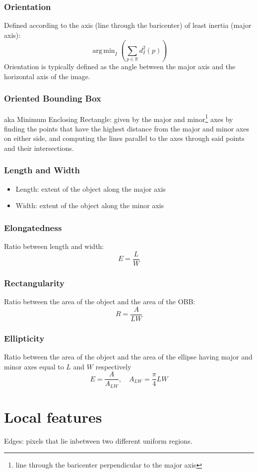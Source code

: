 \documentclass{article}
\DeclareMathOperator*{\argmin}{arg\,min}
\begin{document}
\subsubsection{Orientation}
Defined according to the axis (line through the baricenter) of least inertia (major axis):
\[
    \argmin_I\left( \displaystyle\sum_{p\in\mathbb{R}}^{}d_I^2(p)\right)
\]
Orientation is typically defined as the angle between the major axis and the horizontal axis of the image.
\subsubsection{Oriented Bounding Box}
aka Minimum Enclosing Rectangle: given by the major and minor\footnote{line through the baricenter perpendicular to the major axis} axes by finding the points that have the highest distance from the major and minor axes on either side, and computing the lines parallel to the axes through said points and their intersections. 
\subsubsection{Length and Width}
\begin{itemize}
    \item Length: extent of the object along the major axis
    \item Width: extent of the object along the minor axis
\end{itemize}
\subsubsection{Elongatedness}
Ratio between length and width:
\[
    E=\displaystyle\frac{L}{W}
\]
\subsubsection{Rectangularity}
Ratio between the area of the object and the area of the OBB:
\[
    R=\displaystyle\frac{A}{LW}
\]
\subsubsection{Ellipticity}
Ratio between the area of the object and the area of the ellipse having major and minor axes equal to $L$ and $W$ respectively
\[
    E=\displaystyle\frac{A}{A_{LW}},\quad A_{LW}=\displaystyle\frac{\pi}{4}LW
\]

\section{Local features}
Edges: pixels that lie inbetween two different uniform regions. 
\end{document}
